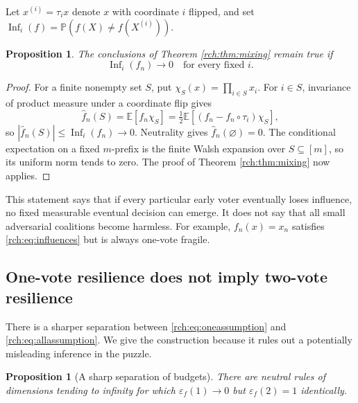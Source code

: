 \documentclass[11pt]{article}
\newtheorem{proposition}[theorem]{Proposition}
\theoremstyle{definition}
\theoremstyle{remark}
\newcommand{\E}{\mathbb E}
\newcommand{\Prb}{\mathbb P}
\newcommand{\eps}{\varepsilon}
\newcommand{\flip}{\tau}
\DeclareMathOperator{\Inf}{Inf}
\begin{document}
Let \(x^{(i)}=\flip_i x\) denote \(x\) with coordinate \(i\) flipped, and set
\(\Inf_i(f)=\Prb(f(X)\ne f(X^{(i)}))\).

\begin{proposition}
\label{rch:prop:influences}
The conclusions of Theorem \ref{rch:thm:mixing} remain true if
\begin{equation}
 \Inf_i(f_n)\longrightarrow0\quad\text{for every fixed }i.
 \label{rch:eq:influences}
\end{equation}
\end{proposition}

\begin{proof}
For a finite nonempty set \(S\), put \(\chi_S(x)=\prod_{i\in S}x_i\).
For \(i\in S\), invariance of product measure under a coordinate flip gives
\[
 \widehat f_n(S)=\E[f_n\chi_S]
 =\tfrac12\E[(f_n-f_n\circ\flip_i)\chi_S],
\]
so \(|\widehat f_n(S)|\le\Inf_i(f_n)\to0\). Neutrality gives
\(\widehat f_n(\varnothing)=0\). The conditional expectation on a fixed
\(m\)-prefix is the finite Walsh expansion over \(S\subseteq[m]\), so its
uniform norm tends to zero. The proof of Theorem \ref{rch:thm:mixing} now applies.
\end{proof}

This statement says that if every particular early voter eventually loses
influence, no fixed measurable eventual decision can emerge. It does not say
that all small adversarial coalitions become harmless. For example,
\(f_n(x)=x_n\) satisfies \eqref{rch:eq:influences} but is always one-vote fragile.

\subsection{One-vote resilience does not imply two-vote resilience}
\label{rch:sec:separation}

There is a sharper separation between \eqref{rch:eq:oneassumption} and
\eqref{rch:eq:allassumption}. We give the construction because it rules out a
potentially misleading inference in the puzzle.

\begin{proposition}[A sharp separation of budgets]
\label{rch:prop:code}
There are neutral rules of dimensions tending to infinity for which
\(\eps_f(1)\to0\) but \(\eps_f(2)=1\) identically.
\end{proposition}
\end{document}
